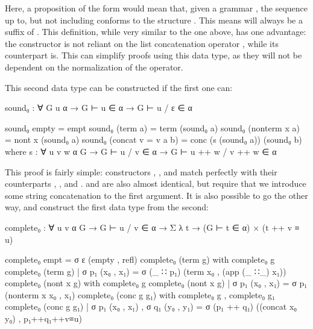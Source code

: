 	Here, a proposition of the form  would mean that,
	given a grammar , the sequence  up to, but not
	including  conforms to the structure . This means
	 will always be a suffix of . This definition, while
	very similar to the one above, has one advantage: the constructor
	 is not reliant on the list concatenation operator
	\codett{++}, while its counterpart  is. This can simplify
	proofs using this data type, as they will not be dependent on the
	normalization of the \codett{++} operator.

	This second data type can be constructed if the first one can:

	\begin{code}
		sound₀ :  ∀ {G u α} → G ⊢ u ∈ α → G ⊢ u / ε ∈ α

		sound₀ empty = empt
		sound₀ (term a) = term (sound₀ a)
		sound₀ (nonterm x a) = nont x (sound₀ a)
		sound₀ (concat {v = v} a b) = conc (s (sound₀ a)) (sound₀ b)
		  where
		s : ∀ {u v w α G} →
		  G ⊢ u / v ∈ α →
		  G ⊢ u ++ w / v ++ w ∈ α
	\end{code}

	This proof is fairly simple: constructors , ,
	and  match perfectly with their counterparts ,
	, and .  and  are
	also almost identical, but require that we introduce some string
	concatenation to the first argument. It is also possible to go the other
	way, and construct the first data type from the second:

	\begin{code}
		complete₀ : ∀ {u v α G} → G ⊢ u / v ∈ α →
		  Σ λ t → (G ⊢ t ∈ α) × (t ++ v ≡ u)

		complete₀ empt = σ ε (empty , refl)
		complete₀ (term g) with complete₀ g
		complete₀ (term g) | σ p₁ (x₀ , x₁) = σ (_ ∷ p₁) (term x₀ , (app (_ ∷_) x₁))
		complete₀ (nont x g) with complete₀ g
		complete₀ (nont x g) | σ p₁ (x₀ , x₁) = σ p₁ (nonterm x x₀ , x₁)
		complete₀ (conc g g₁) with complete₀ g , complete₀ g₁
		complete₀ (conc g g₁) | σ p₁ (x₀ , x₁) , σ q₁ (y₀ , y₁) =
		  σ (p₁ ++ q₁) ((concat x₀ y₀) , p₁++q₁++v≡u)
	\end{code}

